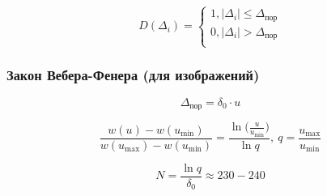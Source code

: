 \begin{equation*}
    D(\Delta_i) =
    \begin{cases}
        1, \mid \Delta_i \mid \le \Delta_{\text{пор}} \\
        0, \mid \Delta_i \mid > \Delta_{\text{пор}} \\
    \end{cases}
\end{equation*}

\subsubsection{Закон Вебера-Фенера (для изображений)}

\begin{equation*}
    \Delta_{\text{пор}} = \delta_0 \cdot u
\end{equation*}

\begin{equation*}
    \frac{w(u) - w(u_{\min})}{w(u_{\max}) - w(u_{\min})} = \frac{\ln\big(\frac{u}{u_{\min}}\big)}{\ln q},\ q = \frac{u_{\max}}{u_{\min}}
\end{equation*}

\begin{equation*}
    N = \frac{\ln q}{\delta_0} \approx 230-240
\end{equation*}

